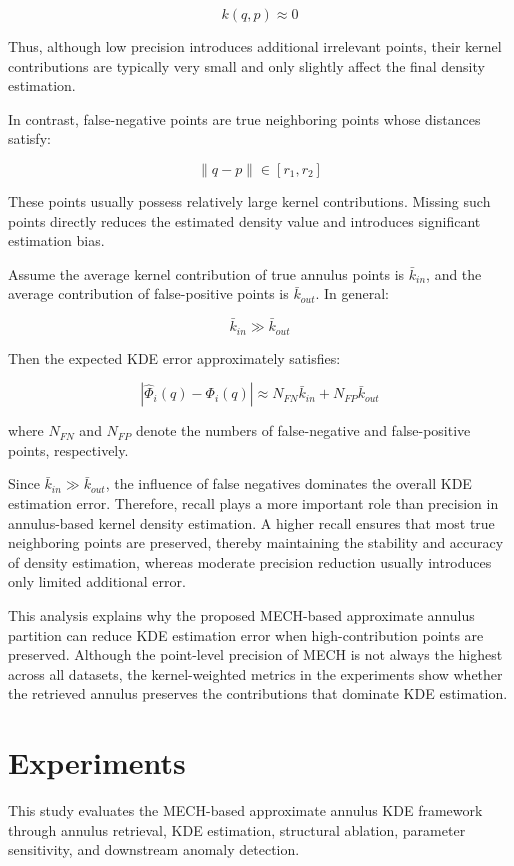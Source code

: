 \documentclass[conference]{IEEEtran}
\begin{document}
\[
k(q,p)\approx 0
\]

Thus, although low precision introduces additional irrelevant points, their kernel contributions are typically very small and only slightly affect the final density estimation.

In contrast, false-negative points are true neighboring points whose distances satisfy:

\[
\|q-p\|\in[r_1,r_2]
\]

These points usually possess relatively large kernel contributions. 
Missing such points directly reduces the estimated density value and introduces significant estimation bias.

Assume the average kernel contribution of true annulus points is $\bar{k}_{in}$, and the average contribution of false-positive points is $\bar{k}_{out}$. 
In general:

\[
\bar{k}_{in}\gg \bar{k}_{out}
\]

Then the expected KDE error approximately satisfies:

\[
|\hat{\Phi}_i(q)-\Phi_i(q)|
\approx
N_{FN}\bar{k}_{in}
+
N_{FP}\bar{k}_{out}
\]

where $N_{FN}$ and $N_{FP}$ denote the numbers of false-negative and false-positive points, respectively.

Since $\bar{k}_{in}\gg \bar{k}_{out}$, the influence of false negatives dominates the overall KDE estimation error. 
Therefore, recall plays a more important role than precision in annulus-based kernel density estimation. 
A higher recall ensures that most true neighboring points are preserved, thereby maintaining the stability and accuracy of density estimation, whereas moderate precision reduction usually introduces only limited additional error.

This analysis explains why the proposed MECH-based approximate annulus partition can reduce KDE estimation error when high-contribution points are preserved. 
Although the point-level precision of MECH is not always the highest across all datasets, the kernel-weighted metrics in the experiments show whether the retrieved annulus preserves the contributions that dominate KDE estimation.

\section{Experiments}
This study evaluates the MECH-based approximate annulus KDE framework through annulus retrieval, KDE estimation, structural ablation, parameter sensitivity, and downstream anomaly detection.
\end{document}
